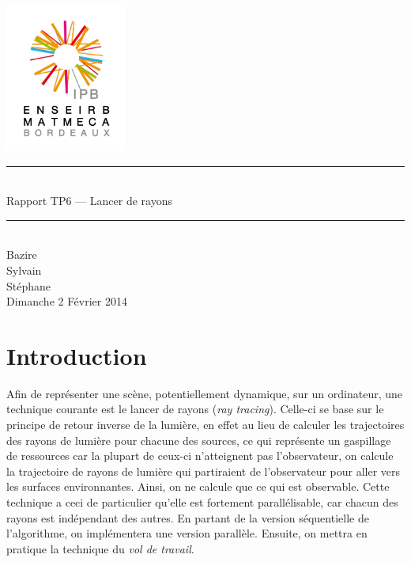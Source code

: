 \documentclass[a4paper,11pt]{article}
\begin{document}
\begin{titlepage}
  \begin{center}

    \begin{center}
      \includegraphics[width=4cm]{EM.jpg}
    \end{center}

    \vspace*{1cm}
        
    \rule{0.75\linewidth}{0.7mm}\\[0.4cm]
    {\Huge Rapport TP6 --- Lancer de rayons\\[0.4cm]}
    \rule{0.75\linewidth}{0.7mm} \\[1.5cm]

    {\Large Bazire \\Sylvain {}\\Stéphane \\[2cm]}
    {\Large Dimanche 2 Février 2014}
  \end{center}
\end{titlepage}

\tableofcontents
\clearpage
\section{Introduction}

Afin de représenter une scène, potentiellement dynamique, sur un ordinateur, une technique courante est le lancer de rayons (\emph{ray tracing}). Celle-ci se base sur le principe de retour inverse de la lumière, en effet au lieu de calculer les trajectoires des rayons de lumière pour chacune des sources, ce qui représente un gaspillage de ressources car la plupart de ceux-ci n'atteignent pas l'observateur, on calcule la trajectoire de rayons de lumière qui partiraient de l'observateur pour aller vers les surfaces environnantes. Ainsi, on ne calcule que ce qui est observable. Cette technique a ceci de particulier qu'elle est fortement parallélisable, car chacun des rayons est indépendant des autres. En partant de la version séquentielle de l'algorithme, on implémentera une version parallèle. Ensuite, on mettra en pratique la technique du \emph{vol de travail}.
\end{document}
